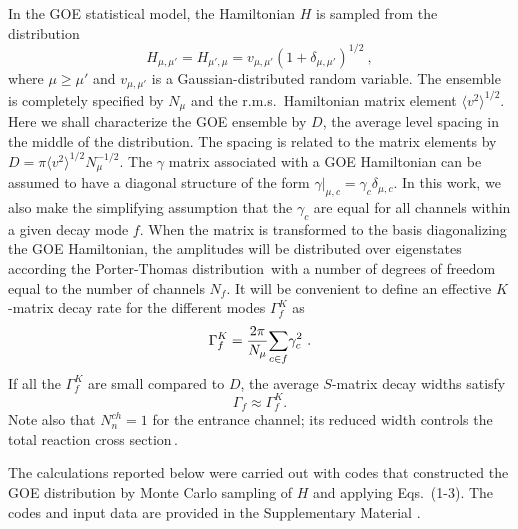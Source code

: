 \documentclass[prl,aps,floatfix,nofootinbib,preprint]{revtex4}
\def\be{\begin{equation}}
\def\ee{\end{equation}}
\begin{document}
In the GOE statistical model, the Hamiltonian $H$ is sampled from the
distribution {\cite{me04}}
\be
H_{\mu,\mu'} = H_{\mu',\mu} = v_{\mu,\mu'} \left( 1 +
\delta_{\mu,\mu'}\right)^{1/2} \ ,
\ee  
where $\mu \ge \mu'$ and $v_{\mu,\mu'}$ is a Gaussian-distributed random variable.  The ensemble is
completely specified by $N_\mu$ and the r.m.s.~Hamiltonian matrix element 
$\langle v^2\rangle^{1/2}$. 
Here we shall
characterize the GOE ensemble by $D$, the average level spacing in the middle
of the distribution. The spacing is related to the matrix elements by $D = \pi 
\langle v^2\rangle^{1/2} N_{\mu}^{-1/2} $.
%
The
$  \gamma$ matrix associated with a GOE Hamiltonian can be assumed to 
have a diagonal structure of the
form
$ \gamma|_{\mu,c} = \gamma_c \delta_{\mu,c}$.  In this work, we also make the
simplifying assumption that
the  $\gamma_c$ are equal for all 
channels within a given decay mode $f$. 
When the matrix is transformed
to the basis diagonalizing the GOE Hamiltonian, the amplitudes will be 
distributed over eigenstates according the Porter-Thomas distribution\,
\cite{PT} 
with a number of degrees of freedom equal to the number of channels $N_f$.  
It will be 
convenient to define an effective $K$-matrix decay rate for the different
modes $\Gamma^K_f$ as
\be
\Gamma^K_f =  {2 \pi \over  N_\mu}{ \sum_{c \in f} } \gamma_c^2 \ .
\ee
If all the $\Gamma_f^K$ are small compared to $D$, 
the average $S$-matrix decay widths satisfy 
\be
\Gamma_f \approx \Gamma_f^K.
\label{Gamma_f}
\ee
Note also that $N^{ch}_n = 1$ for the entrance channel; 
its reduced width controls the total reaction cross section\,\cite{Js}.

The calculations reported below were carried out with codes that constructed the
GOE distribution by Monte Carlo sampling of $H$ and applying {Eqs}.~(1-3).  The
codes and input data are provided in the Supplementary Material \cite{sup}.
\end{document}
